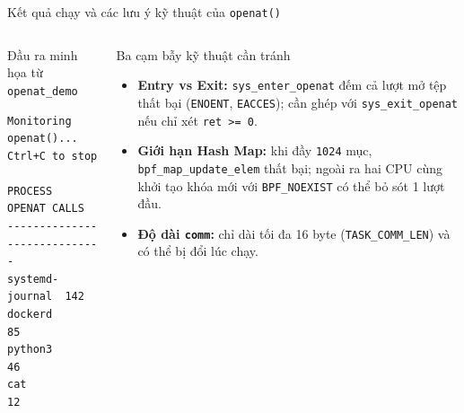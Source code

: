 \begin{frame}[fragile]{Kết quả chạy và các lưu ý kỹ thuật của \texttt{openat()}}
  \begin{columns}[T,onlytextwidth]
    \begin{block}{Đầu ra minh họa từ \texttt{openat\_demo}}
\begin{lstlisting}[style=dense]
Monitoring openat()... Ctrl+C to stop

PROCESS          OPENAT CALLS
-----------------------------
systemd-journal  142
dockerd          85
python3          46
cat              12
\end{lstlisting}
    \end{block}

    \begin{block}{Ba cạm bẫy kỹ thuật cần tránh}
      \small
      \begin{itemize}
        \item \textbf{Entry vs Exit:} \texttt{sys\_enter\_openat} đếm cả lượt mở tệp thất bại (\texttt{ENOENT}, \texttt{EACCES}); cần ghép với \texttt{sys\_exit\_openat} nếu chỉ xét \texttt{ret >= 0}.
        \item \textbf{Giới hạn Hash Map:} khi đầy \texttt{1024} mục, \texttt{bpf\_map\_update\_elem} thất bại; ngoài ra hai CPU cùng khởi tạo khóa mới với \texttt{BPF\_NOEXIST} có thể bỏ sót 1 lượt đầu.
        \item \textbf{Độ dài \texttt{comm}:} chỉ dài tối đa 16 byte (\texttt{TASK\_COMM\_LEN}) và có thể bị đổi lúc chạy.
      \end{itemize}
    \end{block}
  \end{columns}
\end{frame}


